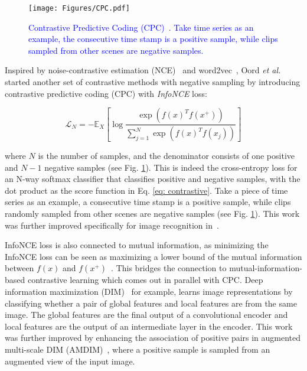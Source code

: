\documentclass[lettersize,journal]{IEEEtran}
\newcommand{\etal}{\textit{et al.}}
\begin{document}
\begin{figure}
\centering
\texttt{[image: Figures/CPC.pdf]}
\caption[CPC]{
\textcolor{blue}{Contrastive Predictive Coding (CPC)~\cite{oord2018representation}. Take time series as an example, the consecutive time stamp is a positive sample, while clips sampled from other scenes are negative samples.}
}
\label{fig:CPC}
\end{figure}



Inspired by noise-contrastive estimation (NCE)~\cite{gutmann2010noise} and word2vec~\cite{mikolov2013efficient,mikolov2013distributed}, Oord \etal~\cite{oord2018representation} started another set of contrastive methods with negative sampling by introducing contrastive predictive coding (CPC) with \textit{InfoNCE} loss:

\begin{equation}
\mathcal{L}_{N}=-\mathbb{E}_{X}\left[\log \frac{\exp \left(f(x)^{T} f\left(x^{+}\right)\right)}{\sum_{j=1}^{N} \exp \left(f(x)^{T} f\left(x_{j}\right)\right)}\right]
\end{equation}

\noindent where $N$ is the number of samples, and the denominator consists of one positive and $N - 1$ negative samples (see Fig. \ref{fig:CPC}). This is indeed the cross-entropy loss for an N-way softmax classifier that classifies positive and negative samples, with the dot product as the score function in Eq. \ref{eq: contrastive}. Take a piece of time series as an example, a consecutive time stamp is a positive sample, while clips randomly sampled from other scenes are negative samples (see Fig. \ref{fig:CPC}). This work was further improved specifically for image recognition in~\cite{henaff2020data}. 

InfoNCE loss is also connected to mutual information, as minimizing the InfoNCE loss can be seen as maximizing a lower bound of the mutual information between $f(x)$ and $f(x^{+})$~\cite{poole2019variational}. This bridges the connection to mutual-information-based contrastive learning which comes out in parallel with CPC. Deep information maximization (DIM)~\cite{hjelm2018learning} for example, learns image representations by classifying whether a pair of global features and local features are from the same image. The global features are the final output of a convolutional encoder and local features are the output of an intermediate layer in the encoder. This work was further improved by enhancing the association of positive pairs in augmented multi-scale DIM (AMDIM)~\cite{bachman2019learning}, where a positive sample is sampled from an augmented view of the input image.
\end{document}
